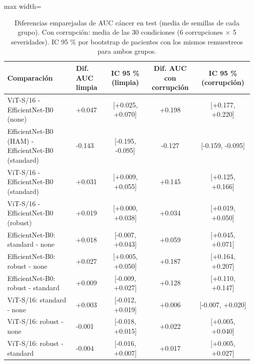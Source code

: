 \begin{table}[t]
\caption{Diferencias emparejadas de AUC cáncer en test (media de semillas de cada grupo). Con corrupción: media de las 30 condiciones (6 corrupciones $\times$ 5 severidades). IC 95 \% por bootstrap de pacientes con los mismos remuestreos para ambos grupos.}
\label{tab:paired}
\centering
\begin{adjustbox}{max width=\linewidth}
\begin{tabular}{llccc}
\toprule
Comparación & Dif. AUC limpia & IC 95 \% (limpia) & Dif. AUC con corrupción & IC 95 \% (corrupción) \\
\midrule
ViT-S/16 - EfficientNet-B0 (none) & +0.047 & [+0.025, +0.070] & +0.198 & [+0.177, +0.220] \\
EfficientNet-B0 (HAM) - EfficientNet-B0 (standard) & -0.143 & [-0.195, -0.095] & -0.127 & [-0.159, -0.095] \\
ViT-S/16 - EfficientNet-B0 (standard) & +0.031 & [+0.009, +0.055] & +0.145 & [+0.125, +0.166] \\
ViT-S/16 - EfficientNet-B0 (robust) & +0.019 & [+0.000, +0.038] & +0.034 & [+0.019, +0.050] \\
EfficientNet-B0: standard - none & +0.018 & [-0.007, +0.043] & +0.059 & [+0.045, +0.071] \\
EfficientNet-B0: robust - none & +0.027 & [+0.005, +0.050] & +0.187 & [+0.164, +0.207] \\
EfficientNet-B0: robust - standard & +0.009 & [-0.009, +0.027] & +0.128 & [+0.110, +0.147] \\
ViT-S/16: standard - none & +0.003 & [-0.012, +0.019] & +0.006 & [-0.007, +0.020] \\
ViT-S/16: robust - none & -0.001 & [-0.018, +0.015] & +0.022 & [+0.005, +0.040] \\
ViT-S/16: robust - standard & -0.004 & [-0.016, +0.007] & +0.017 & [+0.005, +0.027] \\
\bottomrule
\end{tabular}
\end{adjustbox}
\end{table}
